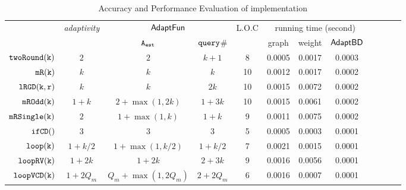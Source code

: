 {\footnotesize
\begin {table}[H]
\vspace{-0.4cm}
    \caption{Accuracy and Performance Evaluation of {\THESYSTEM} implementation}
    \vspace{-0.5cm}
        \label{tb:adapt-imp}
        \begin{center}
        \centering
{\tiny
        \begin{tabular}{| >{\tiny}r | c | c | c | c | c | c | c | c | c | c | c }
         \hline \hline
        \multirow{2}{*}{Program $c$} & 
        \multirow{2}{*}{\emph{adaptivity}}
         & \multicolumn{2}{c|}{$\textsf{AdaptFun}$}
         & {L.O.C}
         & \multicolumn{3}{c|}{running time (second)} \\ 
         \cline{3-8}
         & & {${\mathtt{A_{est}}}$ } & {${\tt query}$\# } &  & graph & weight & $\mathsf{AdaptBD}$ \\ 
         \cline{6-8}
         \hline \hline
         $  \mathtt{twoRound(k)}$ & $2$ &  $2$ & $k+1 $  & 8 & 0.0005 & 0.0017 & 0.0003 \\
         $  \mathtt{mR(k)}$ & $k$ &  $k$ & $k$  &  10 & 0.0012 & 0.0017  & 0.0002 \\
         $  \mathtt{lRGD(k, r)}$ & $k$ & $k  $ & $ 2k $  &  10 & 0.0015 & 0.0072  & 0.0002  \\
         $  \mathtt{mROdd(k)}$ & $1 + k$ &  $2+\max(1,2k)  $ & $1 + 3 k  $  &  10 & 0.0015 & 0.0061  & 0.0002 \\
         $  \mathtt{mRSingle(k)}$    & $2$ &  $1+ \max(1, k) $ & $1 + k $  &  9 & 0.0011 & 0.0075  & 0.0002 \\
         $  \mathtt{ifCD()}$ & $3$ & $3 $ &   $3$  & 5 & 0.0005 & 0.0003   & 0.0001 \\
         $  \mathtt{loop(k)}$ & $1+k/2$ &   $1 +\max(1, k/2)  $  &  $1+k/2  $ & 7 & 0.0021 & 0.0015 &  0.0001 \\
         $  \mathtt{loopRV(k)}$ & $1 + 2k$ &  $1 + 2k$ & $2 + 3 k$  &  9 & 0.0016 & 0.0056 & 0.0001  \\
         $  {\mathtt{loopVCD(k)}} $ & ${1 + 2Q_m}$ &  ${Q_m+\max(1,2Q_m)}$  & $2+2Q_m$   &  6 & 0.0016 & 0.0007 & 0.0001 \\

\end{tabular}}
\end{center}
\end{table}}
